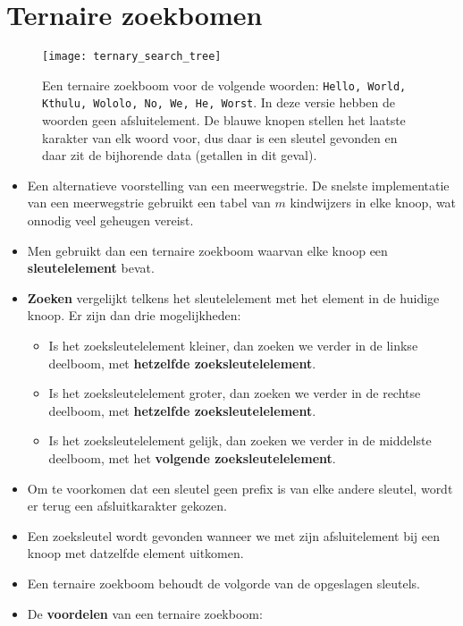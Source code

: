 \section{Ternaire zoekbomen}
\begin{figure}[ht]
    \centering
    \texttt{[image: ternary\_search\_tree]}
    \caption{Een ternaire zoekboom voor de volgende woorden: \texttt{Hello, World, Kthulu, Wololo, No, We, He, Worst}. In deze versie hebben de woorden geen afsluitelement. De blauwe knopen stellen het laatste karakter van elk woord voor, dus daar is een sleutel gevonden en daar zit de bijhorende data (getallen in dit geval).}
    \label{fig:ternary_search_tree}
\end{figure}
\begin{itemize}
    \item Een alternatieve voorstelling van een meerwegstrie.
    \alert De snelste implementatie van een meerwegstrie gebruikt een tabel van $m$ kindwijzers in elke knoop, wat onnodig veel geheugen vereist.
    \item Men gebruikt dan een ternaire zoekboom waarvan elke knoop een \textbf{sleutelelement} bevat.
    \item \textbf{Zoeken} vergelijkt telkens het sleutelelement met het element in de huidige knoop. Er zijn dan drie mogelijkheden:
    \begin{itemize}
        \item Is het zoeksleutelelement kleiner, dan zoeken we verder in de linkse deelboom, met \textbf{hetzelfde zoeksleutelelement}.
        \item Is het zoeksleutelelement groter, dan zoeken we verder in de rechtse deelboom, met \textbf{hetzelfde zoeksleutelelement}.
        \item Is het zoeksleutelelement gelijk, dan zoeken we verder in de middelste deelboom, met het \textbf{volgende zoeksleutelelement}.
    \end{itemize}
    \item Om te voorkomen dat een sleutel geen prefix is van elke andere sleutel, wordt er terug een afsluitkarakter gekozen.
    \item Een zoeksleutel wordt gevonden wanneer we met zijn afsluitelement bij een knoop met datzelfde element uitkomen.
    \item Een ternaire zoekboom behoudt de volgorde van de opgeslagen sleutels.
    \item De \textbf{voordelen} van een ternaire zoekboom:
    \begin{itemize}

\end{itemize}
\end{itemize}

